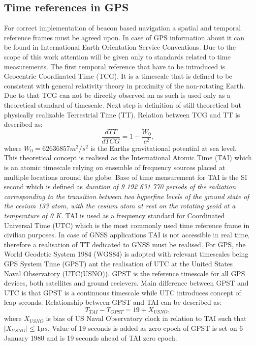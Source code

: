 \subsection{Time references in GPS}
For correct implementation of beacon based navigation a spatial and temporal reference frames 
must be agreed upon. In case of GPS information about it can be found in International Earth
Orientation Service Conventions. Due to the scope of this work attention will be given only to
standards related to time measurements. The first temporal reference that have to be introduced
is Geocentric Coordinated Time (TCG). It is a timescale that is defined to be consistent with
general relativity theory in proximity of the non-rotating Earth. Due to that TCG can not be
directly observed an as such is used only as a theoretical standard of timescale.
Next step is definition of still theoretical but physically realizable Terrestrial Time (TT).
Relation between TCG and TT is described as:
\begin{equation}
	\label{equ:tcg_to_tt}
	\frac{dTT}{dTCG} = 1 - \frac{W_{0}}{c^2},
\end{equation}
where $W_{0} = 62636857 m^{2}/s^{2}$ is the Earths gravitational potential at sea level.
This theoretical concept is realised as the International Atomic Time (TAI) which is an
atomic timescale relying on ensemble of frequency sources placed at multiple locations around 
the globe. Base of time measurement for TAI is the SI second which is defined as 
\textit{
	duration of 9 192 631 770 periods of the radiation corresponding to the transition between
	two hyperfine levels of the ground state of the cesium 133 atom, with the cesium atom at 
	rest on the rotating geoid at a temperature of 0 K.
}
TAI is used as a frequency standard for Coordinated Universal Time (UTC) which is the most
commonly used time reference frame in civilian purposes.
In case of GNSS applications TAI is not accessible in real time, therefore a realisation of 
TT dedicated to GNSS must be realised.
For GPS, the World Geodetic System 1984 (WGS84) is adopted with relevant timescales being 
GPS System Time (GPST) ant the realisation of UTC at the United States Naval Observatory 
(UTC(USNO)). GPST is the reference timescale for all GPS devices, both satellites and ground
recievers. Main difference between GPST and UTC is that GPST is a continuous timescale while 
UTC introduces concept of leap seconds.
Relationship between GPST and TAI can be described as:
\begin{equation}
	\label{equ:gpst_to_tai}
	T_{TAI}-T_{GPST} = 19 + X_{USNO},
\end{equation}
where $X_{USNO}$ is bias of US Naval Observatory clock in relation to TAI such that 
$|X_{USNO}| \le 1\mu s$. Value of $19$ seconds is added as zero epoch of GPST is set on 
6 January 1980 and is 19 seconds ahead of TAI zero epoch.

